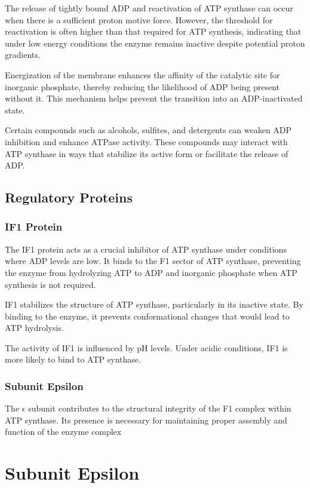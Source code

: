 \documentclass{article}
\begin{document}
The release of tightly bound ADP and reactivation of ATP synthase can occur when there is a sufficient proton motive force. However, the threshold for reactivation is often higher than that required for ATP synthesis, indicating that under low energy conditions the enzyme remains inactive despite potential proton gradients.

Energization of the membrane enhances the affinity of the catalytic site for inorganic phosphate, thereby reducing the likelihood of ADP being present without it. This mechanism helps prevent the transition into an ADP-inactivated state.

Certain compounds such as alcohols, sulfites, and detergents can weaken ADP inhibition and enhance ATPase activity. These compounds may interact with ATP synthase in ways that stabilize its active form or facilitate the release of ADP.

\subsection{Regulatory Proteins}

\subsubsection{IF1 Protein}

The IF1 protein acts as a crucial inhibitor of ATP synthase under conditions where ADP levels are low. It binds to the F1 sector of ATP synthase, preventing the enzyme from hydrolyzing ATP to ADP and inorganic phosphate when ATP synthesis is not required.

IF1 stabilizes the structure of ATP synthase, particularly in its inactive state. By binding to the enzyme, it prevents conformational changes that would lead to ATP hydrolysis.

The activity of IF1 is influenced by pH levels. Under acidic conditions, IF1 is more likely to bind to ATP synthase.

\subsubsection{Subunit Epsilon}

The $\epsilon$ subunit contributes to the structural integrity of the F1 complex within ATP synthase. Its presence is necessary for maintaining proper assembly and function of the enzyme complex

\section{Subunit Epsilon}
\end{document}

